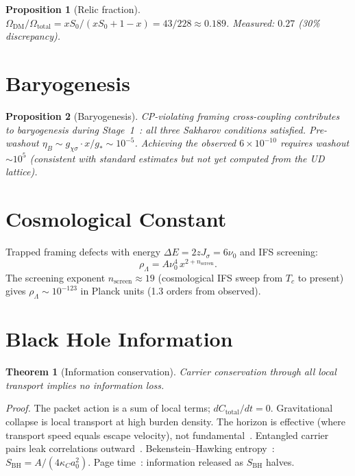 \documentclass[11pt,twocolumn]{article}
\newtheorem{theorem}{Theorem}
\newtheorem{proposition}{Proposition}
\begin{document}
\begin{proposition}[Relic fraction]
\label{prop:dm}
$\Omega_{\mathrm{DM}}/\Omega_{\mathrm{total}}=xS_0/(xS_0+1{-}x)=43/228\approx 0.189$.
Measured: $0.27$ (30\% discrepancy).
\end{proposition}

\section{Baryogenesis}
\label{sec:baryo}

\begin{proposition}[Baryogenesis]
\label{prop:baryo}
CP-violating framing cross-coupling contributes to baryogenesis during Stage~1~\cite{sakharov1967,kuzmin1985}: all three Sakharov conditions satisfied.
Pre-washout $\eta_B\sim g_{\chi\sigma}\cdot x/g_*\sim 10^{-5}$.
Achieving the observed $6\times 10^{-10}$ requires washout $\sim 10^5$ (consistent with standard estimates but not yet computed from the UD lattice).
\end{proposition}

\section{Cosmological Constant}
\label{sec:cc}

Trapped framing defects with energy $\Delta E=2zJ_\sigma=6\nu_0$ and IFS screening:
\begin{equation}
\rho_\Lambda=A\nu_0^4\,x^{2+n_{\mathrm{screen}}}.
\label{eq:Lambda}
\end{equation}
The screening exponent $n_{\mathrm{screen}}\approx 19$ (cosmological IFS sweep from $T_c$ to present) gives $\rho_\Lambda\sim 10^{-123}$ in Planck units (1.3 orders from observed).

\section{Black Hole Information}
\label{sec:bh}

\begin{theorem}[Information conservation]
\label{thm:info}
Carrier conservation through all local transport implies no information loss.
\end{theorem}

\textit{Proof.}
The packet action is a sum of local terms; $dC_{\mathrm{total}}/dt=0$.
Gravitational collapse is local transport at high burden density.
The horizon is effective (where transport speed equals escape velocity), not fundamental~\cite{einstein1915}.
Entangled carrier pairs leak correlations outward~\cite{hawking1975}.
Bekenstein--Hawking entropy~\cite{bekenstein1973}: $S_{\mathrm{BH}}=A/(4\kappa_C a_0^2)$.
Page time~\cite{page1993}: information released as $S_{\mathrm{BH}}$ halves.
\end{document}

